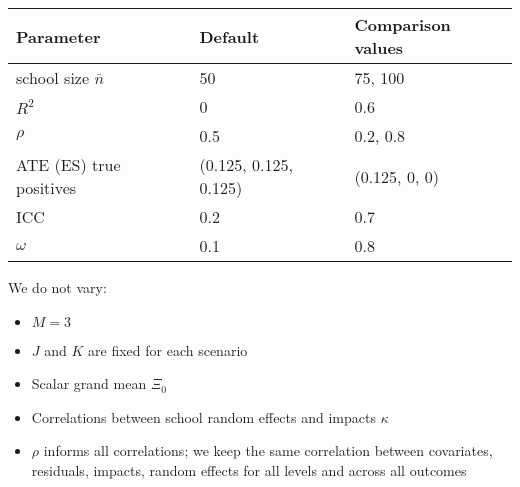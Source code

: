 \documentclass[
]{article}
\providecommand{\tightlist}{%
  \setlength{\itemsep}{0pt}\setlength{\parskip}{0pt}}
\begin{document}
\begin{longtable}[]{@{}lll@{}}
\toprule
Parameter & Default & Comparison values \\
\midrule
\endhead
school size \(\bar{n}\) & 50 & 75, 100 \\
\(R^2\) & 0 & 0.6 \\
\(\rho\) & 0.5 & 0.2, 0.8 \\
ATE (ES) true positives & (0.125, 0.125, 0.125) & (0.125, 0, 0) \\
ICC & 0.2 & 0.7 \\
\(\omega\) & 0.1 & 0.8 \\
\bottomrule
\end{longtable}

We do not vary:

\begin{itemize}
\tightlist
\item
  \(M = 3\)
\item
  \(J\) and \(K\) are fixed for each scenario
\item
  Scalar grand mean \(\Xi_0\)
\item
  Correlations between school random effects and impacts \(\kappa\)
\item
  \(\rho\) informs all correlations; we keep the same correlation
  between covariates, residuals, impacts, random effects for all levels
  and across all outcomes
\end{itemize}
\end{document}
